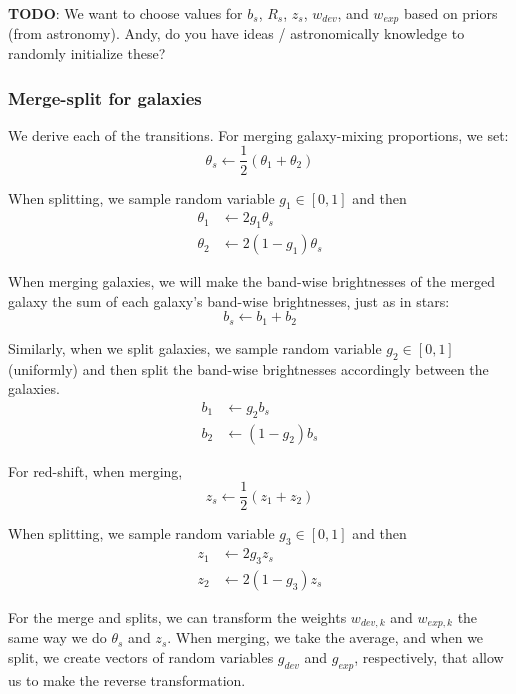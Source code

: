 \documentclass[11pt]{article}
\begin{document}
\textbf{TODO}:
We want to choose values for $b_s$, $R_s$, $z_s$, $w_{dev}$,
and $w_{exp}$ based on priors (from astronomy). Andy,
do you have ideas / astronomically knowledge to randomly initialize these?

\subsubsection{Merge-split for galaxies}

We derive each of the transitions.
For merging galaxy-mixing proportions, we set:
\begin{equation*}
\theta_s \leftarrow \frac{1}{2}(\theta_1 + \theta_2)
\end{equation*}

When splitting, we sample random variable $g_1 \in [0, 1]$ and then
\begin{align*}
\theta_1 &\leftarrow 2 g_1 \theta_s \\
\theta_2 &\leftarrow 2(1 - g_1) \theta_s
\end{align*}

When merging galaxies, we will make the band-wise brightnesses of the merged galaxy
the sum of each galaxy's band-wise brightnesses, just as in stars:
\begin{equation*}
b_s \leftarrow b_{1} + b_{2}
\end{equation*}

Similarly, when we split galaxies, we sample random variable $g_2 \in [0, 1]$ (uniformly) and then
split the band-wise brightnesses accordingly between the galaxies.
\begin{align*}
b_{1} & \leftarrow g_2 b_s\\
b_{2} & \leftarrow (1 - g_2) b_s
\end{align*}

For red-shift, when merging,
\begin{equation*}
z_s \leftarrow \frac{1}{2}(z_1 + z_2)
\end{equation*}

When splitting, we sample random variable $g_3 \in [0, 1]$ and then
\begin{align*}
z_1 &\leftarrow 2 g_3 z_s \\
z_2 &\leftarrow 2(1 - g_3) z_s
\end{align*}

For the merge and splits, we can transform the weights $w_{dev, k}$ and $w_{exp, k}$
the same way we do $\theta_s$ and $z_s$. When merging, we take the average,
and when we split, we create vectors of random variables $g_{dev}$ and $g_{exp}$, respectively,
that allow us to make the reverse
transformation.
\end{document}
